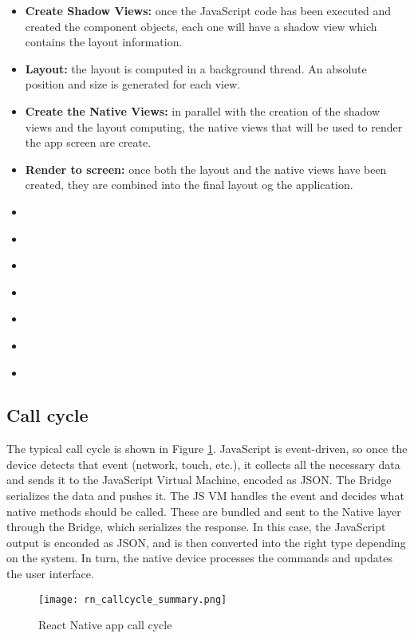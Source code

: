 \begin{itemize}
 \item \textbf{Create Shadow Views:} once the JavaScript code has been executed and created the component objects, each one will have a shadow view which contains the layout information.
 \item \textbf{Layout:} the layout is computed in a background thread. An absolute position and size is generated for each view.
 \item \textbf{Create the Native Views:} in parallel with the creation of the shadow views and the layout computing, the native views that will be used to render the app screen are create.
 \item \textbf{Render to screen:} once both the layout and the native views have been created, they are combined into the final layout og the application.
 \item \textbf{}
 \item \textbf{}
 \item \textbf{}
 \item \textbf{}
 \item \textbf{}
 \item \textbf{}
 \item \textbf{}
\end{itemize}


\subsection{Call cycle}

The typical  call cycle is shown in Figure \ref{fig:rncallcyclesummary}. JavaScript is event-driven, so once the device detects that event (network, touch, etc.), it collects all the necessary data and sends it to the JavaScript Virtual Machine, encoded as JSON. The Bridge serializes the data and pushes it. The JS VM handles the event and decides what native methods should be called. These are bundled and sent to the Native layer through the Bridge, which serializes the response. In this case, the JavaScript output is enconded as JSON, and is then converted into the right type depending on the system. In turn, the native device processes the commands and updates the user interface.

\begin{figure}[H]
	\centering
	\texttt{[image: rn\_callcycle\_summary.png]}
	\caption{React Native app call cycle\label{fig:rncallcyclesummary}}
\end{figure}